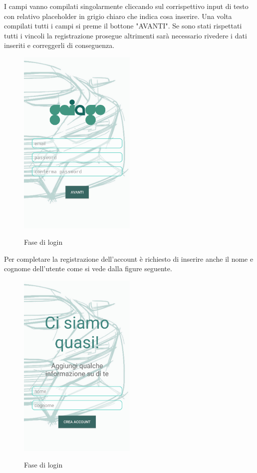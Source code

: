 I campi vanno compilati singolarmente cliccando sul corrispettivo input di testo con relativo placeholder in grigio chiaro che indica cosa inserire. Una volta compilati tutti i campi si preme il bottone "AVANTI". Se sono stati rispettati tutti i vincoli la registrazione prosegue altrimenti sarà necessario rivedere i dati inseriti e correggerli di conseguenza. 
 \begin{figure}[H] 
 	\centering 
 	\includegraphics[width=0.5\textwidth]{res/images/registrazione.png}\\
 	\caption{Fase di login}
 	\label{Login}
 \end{figure}

\pagebreak

Per completare la registrazione dell'account è richiesto di inserire anche il nome e cognome dell'utente come si vede dalla figure seguente.
 \begin{figure}[H] 
	\centering 
	\includegraphics[width=0.5\textwidth]{res/images/registrazione2.png}\\
	\caption{Fase di login}
	\label{Login}
\end{figure}

